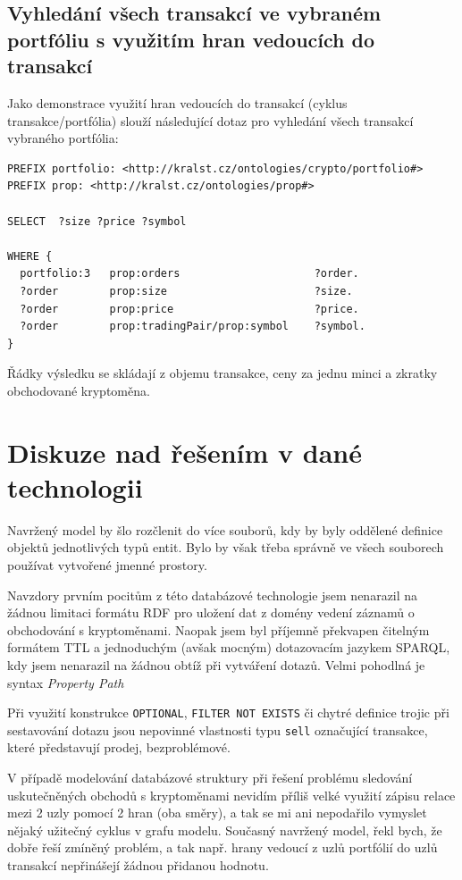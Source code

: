\documentclass[12pt, a4paper]{article}
\let\oldsection\section
\renewcommand\section{\clearpage\oldsection}
\begin{document}
\subsection{Vyhledání všech transakcí ve vybraném portfóliu s využitím hran vedoucích do transakcí}
Jako demonstrace využití hran vedoucích do transakcí (cyklus transakce/portfólia) slouží následující dotaz pro vyhledání všech transakcí vybraného portfólia:

\begin{lstlisting}
PREFIX portfolio: <http://kralst.cz/ontologies/crypto/portfolio#>
PREFIX prop: <http://kralst.cz/ontologies/prop#>

SELECT  ?size ?price ?symbol

WHERE {
  portfolio:3	prop:orders						?order.
  ?order		prop:size 						?size.
  ?order		prop:price 						?price.
  ?order		prop:tradingPair/prop:symbol 	?symbol.
}
\end{lstlisting}

Řádky výsledku se skládají z objemu transakce, ceny za jednu minci a zkratky obchodované kryptoměna.


\section{Diskuze nad řešením v dané technologii}
Navržený model by šlo rozčlenit do více souborů, kdy by byly oddělené definice objektů jednotlivých typů entit. Bylo by však třeba správně ve všech souborech používat vytvořené jmenné prostory.

Navzdory prvním pocitům z této databázové technologie jsem nenarazil na žádnou limitaci formátu RDF pro uložení dat z domény vedení záznamů o obchodování s kryptoměnami. Naopak jsem byl příjemně překvapen čitelným formátem TTL a jednoduchým (avšak mocným) dotazovacím jazykem SPARQL, kdy jsem nenarazil na žádnou obtíž při vytváření dotazů. Velmi pohodlná je syntax \textit{Property Path}

Při využití konstrukce \texttt{OPTIONAL}, \texttt{FILTER NOT EXISTS} či chytré definice trojic při sestavování dotazu jsou nepovinné vlastnosti typu \texttt{sell} označující transakce, které představují prodej, bezproblémové.

V případě modelování databázové struktury při řešení problému sledování uskutečněných obchodů s kryptoměnami nevidím příliš velké využití zápisu relace mezi 2 uzly pomocí 2 hran (oba směry), a tak se mi ani nepodařilo vymyslet nějaký užitečný cyklus v grafu modelu. Současný navržený model, řekl bych, že dobře řeší zmíněný problém, a tak např. hrany vedoucí z uzlů portfólií do uzlů transakcí nepřinášejí žádnou přidanou hodnotu. 
\end{document}
